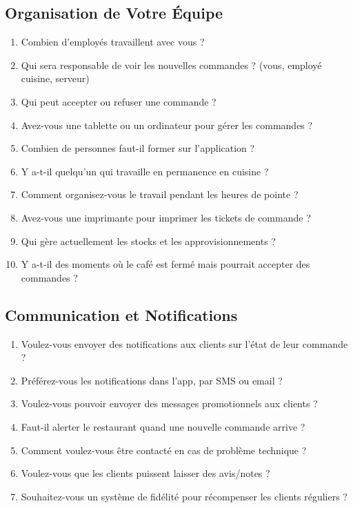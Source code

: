 \documentclass[11pt,a4paper]{article}
\begin{document}
\subsection{Organisation de Votre Équipe}

\begin{enumerate}[resume]
    \item Combien d'employés travaillent avec vous ?
    \item Qui sera responsable de voir les nouvelles commandes ? (vous, employé cuisine, serveur)
    \item Qui peut accepter ou refuser une commande ?
    \item Avez-vous une tablette ou un ordinateur pour gérer les commandes ?
    \item Combien de personnes faut-il former sur l'application ?
    \item Y a-t-il quelqu'un qui travaille en permanence en cuisine ?
    \item Comment organisez-vous le travail pendant les heures de pointe ?
    \item Avez-vous une imprimante pour imprimer les tickets de commande ?
    \item Qui gère actuellement les stocks et les approvisionnements ?
    \item Y a-t-il des moments où le café est fermé mais pourrait accepter des commandes ?
\end{enumerate}

\subsection{Communication et Notifications}

\begin{enumerate}[resume]
    \item Voulez-vous envoyer des notifications aux clients sur l'état de leur commande ?
    \item Préférez-vous les notifications dans l'app, par SMS ou email ?
    \item Voulez-vous pouvoir envoyer des messages promotionnels aux clients ?
    \item Faut-il alerter le restaurant quand une nouvelle commande arrive ?
    \item Comment voulez-vous être contacté en cas de problème technique ?
    \item Voulez-vous que les clients puissent laisser des avis/notes ?
    \item Souhaitez-vous un système de fidélité pour récompenser les clients réguliers ?
\end{enumerate}
\end{document}
